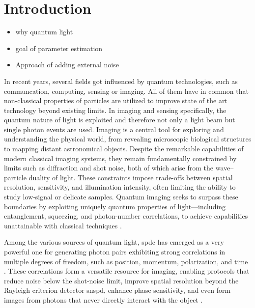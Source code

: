 \section{Introduction}

\begin{itemize}
    \item why quantum light
    \item goal of parameter estimation
    \item Approach of adding external noise
\end{itemize}
In recent years, several fields got influenced by quantum technologies, such as communcation, computing, sensing or imaging. All of them have in common that non-classical properties of particles are utilized to improve state of the art technology beyond existing limits. \newline
In imaging and sensing specifically, the quantum nature of light is exploited and therefore not only a light beam but single photon events are used. 
\newline
Imaging is a central tool for exploring and understanding the physical world, from revealing microscopic biological structures to mapping distant astronomical objects. Despite the remarkable capabilities of modern classical imaging systems, they remain fundamentally constrained by limits such as diffraction and shot noise, both of which arise from the wave--particle duality of light. These constraints impose trade-offs between spatial resolution, sensitivity, and illumination intensity, often limiting the ability to study low-signal or delicate samples. Quantum imaging seeks to surpass these boundaries by exploiting uniquely quantum properties of light---including entanglement, squeezing, and photon-number correlations, to achieve capabilities unattainable with classical techniques \cite{defienneAdvancesQuantumImaging2024,moreauImagingQuantumStates2019}.

Among the various sources of quantum light, \acrfull{spdc} has emerged as a very powerful one for generating photon pairs exhibiting strong correlations in multiple degrees of freedom, such as position, momentum, polarization, and time \cite{moreauImagingQuantumStates2019}. These correlations form a versatile resource for imaging, enabling protocols that reduce noise below the shot-noise limit, improve spatial resolution beyond the Rayleigh criterion detector \acrfull{snspd}, enhance phase sensitivity, and even form images from photons that never directly interact with the object \cite{defienneAdvancesQuantumImaging2024,moreauImagingQuantumStates2019}. 

